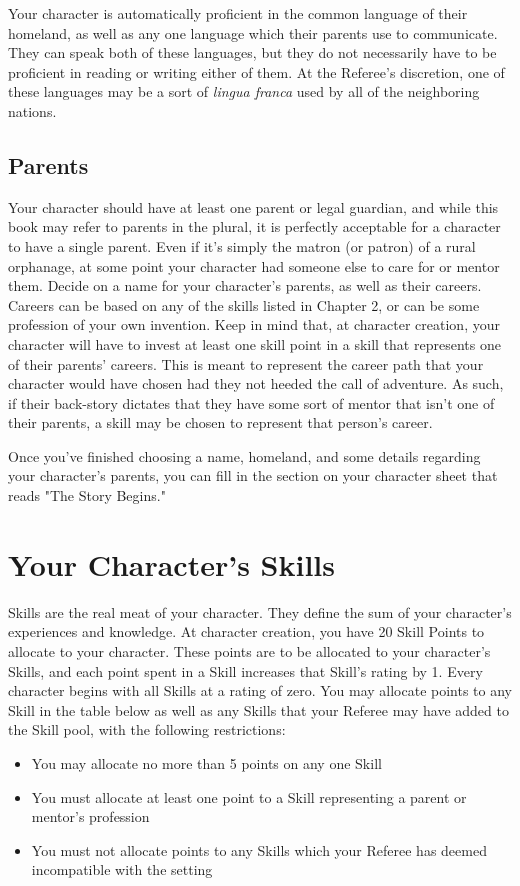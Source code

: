 \documentclass[oneside]{book}
\begin{document}
\begin{multicols}{2}
Your character is automatically proficient in the common language of their homeland, as well as any one language which their parents use to communicate. They can speak both of these languages, but they do not necessarily have to be proficient in reading or writing either of them. At the Referee's discretion, one of these languages may be a sort of \emph{lingua franca} used by all of the neighboring nations. 

\subsection{Parents}
Your character should have at least one parent or legal guardian, and while this book may refer to parents in the plural, it is perfectly acceptable for a character to have a single parent. Even if it's simply the matron (or patron) of a rural orphanage, at some point your character had someone else to care for or mentor them. Decide on a name for your character's parents, as well as their careers. Careers can be based on any of the skills listed in Chapter 2, or can be some profession of your own invention. Keep in mind that, at character creation, your character will have to invest at least one skill point in a skill that represents one of their parents' careers. This is meant to represent the career path that your character would have chosen had they not heeded the call of adventure. As such, if their back-story dictates that they have some sort of mentor that isn't one of their parents, a skill may be chosen to represent that person's career.

Once you've finished choosing a name, homeland, and some details regarding your character's parents, you can fill in the section on your character sheet that reads "The Story Begins."

\section{Your Character's Skills}
Skills are the real meat of your character. They define the sum of your character's experiences and knowledge. At character creation, you have 20 Skill Points to allocate to your character. These points are to be allocated to your character's Skills, and each point spent in a Skill increases that Skill's rating by 1. Every character begins with all Skills at a rating of zero. You may allocate points to any Skill in the table below as well as any Skills that your Referee may have added to the Skill pool, with the following restrictions:
	\begin{itemize}
		\item{ \small You may allocate no more than 5 points on any one Skill}
		\item{ \small You must allocate at least one point to a Skill representing a parent or mentor's profession}
		\item{ \small You must not allocate points to any Skills which your Referee has deemed incompatible with the setting}
\end{itemize}	


\end{multicols}
\end{document}
